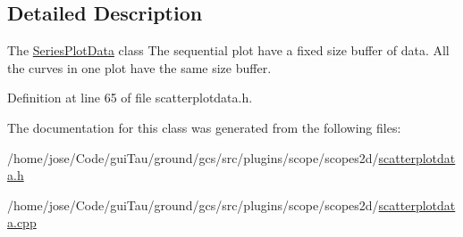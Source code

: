 \subsection{Detailed Description}
The \hyperlink{class_series_plot_data}{Series\-Plot\-Data} class The sequential plot have a fixed size buffer of data. All the curves in one plot have the same size buffer. 

Definition at line 65 of file scatterplotdata.\-h.



The documentation for this class was generated from the following files\-:\begin{DoxyCompactItemize}
\item 
/home/jose/\-Code/gui\-Tau/ground/gcs/src/plugins/scope/scopes2d/\hyperlink{scatterplotdata_8h}{scatterplotdata.\-h}\item 
/home/jose/\-Code/gui\-Tau/ground/gcs/src/plugins/scope/scopes2d/\hyperlink{scatterplotdata_8cpp}{scatterplotdata.\-cpp}\end{DoxyCompactItemize}
